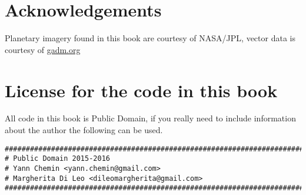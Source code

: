 \documentclass[10pt]{book}
\begin{document}
\newpage
\section{Acknowledgements}
Planetary imagery found in this book are courtesy of NASA/JPL, vector data is courtesy of \href{http:/gadm.org}{gadm.org}
\section{License for the code in this book}
All code in this book is Public Domain, if you really need to include information about the author 
the following can be used.
\begin{verbatim}
###############################################################################
# Public Domain 2015-2016
# Yann Chemin <yann.chemin@gmail.com>
# Margherita Di Leo <dileomargherita@gmail.com>
###############################################################################
\end{verbatim}
\end{document}
